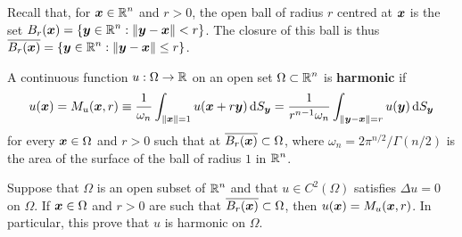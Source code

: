 Recall that, for $\displaystyle {\bm{x}} \in \mathbb{R}^n$ and $r > 0$, the
open ball of radius $r$ centred at ${\bm{x}}$ is the set
$\displaystyle B_r({\bm{x}}) = \left\{ {\bm{y}}\in \mathbb{R}^n : 
\|{\bm{y}}-{\bm{x}}\|<r \right\}$.  The closure of this ball is thus
$\displaystyle \overline{B_r({\bm{x}})} = \left\{ {\bm{y}}\in \mathbb{R}^n : 
\|{\bm{y}}-{\bm{x}}\|\leq r \right\}$.

\begin{defn} %
A continuous function $u:\Omega \to \mathbb{R}$ on an open set   \label{defnHarmFunct}
$\displaystyle \Omega \subset \mathbb{R}^n$ is
{\bfseries harmonic} if
\[
u({\bm{x}}) = M_u({\bm{x}},r) \equiv \frac{1}{\omega_n}
\int_{\|{\bm{x}}\|=1} u({\bm{x}} + r{\bm{y}}) \,\mathrm{d}{S}_{{\bm{y}}}
= \frac{1}{r^{n-1}\omega_n} \int_{\|{\bm{y}}-{\bm{x}}\|=r} u({\bm{y}}) \,\mathrm{d}{S}_{{\bm{y}}}
\]
for every ${\bm{x}} \in \Omega$ and $r>0$ such that
at $\overline{B_r({\bm{x}})} \subset \Omega$,
where $\displaystyle \omega_n = 2\pi^{n/2}\big/ \Gamma(n/2)$ is the area of the
surface of the ball of radius $1$ in $\displaystyle \mathbb{R}^n$.
\end{defn}

\begin{theorem} \label{laplace_MVT}
Suppose that $\Omega$ is an open subset of $\displaystyle \mathbb{R}^n$ and that
$\displaystyle u \in C^2(\Omega)$ satisfies $\Delta u = 0$
on $\Omega$.  If ${\bm{x}} \in \Omega$ and $r>0$ are such
that $\displaystyle \overline{B_r({\bm{x}})} \subset \Omega$, then
$u({\bm{x}}) = M_u({\bm{x}},r)$.  In particular, this prove that $u$ is
harmonic on $\Omega$. 
\end{theorem}


